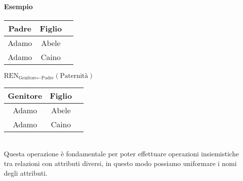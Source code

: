 \paragraph*{Esempio}
\begin{tabular}{|c|c|c|}
    \hline
    \textbf{Padre} & \textbf{Figlio} \\
    \hline
    Adamo          & Abele           \\
    \hline
    Adamo          & Caino           \\
    \hline
\end{tabular}
$\text{REN}_{\text{Genitore}\leftarrow\text{Padre}}(\text{Paternità})$
\begin{tabular}{|c|c|c|}
    \hline
    \textbf{Genitore} & \textbf{Figlio} \\
    \hline
    Adamo          & Abele           \\
    \hline
    Adamo          & Caino           \\
    \hline
\end{tabular}\\
Questa operazione è fondamentale per poter effettuare operazioni insiemistiche tra
relazioni con attributi diversi, in questo modo possiamo uniformare i nomi degli attributi.


